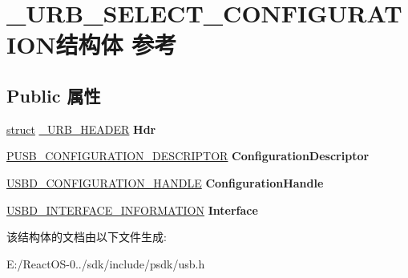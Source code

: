 \hypertarget{struct___u_r_b___s_e_l_e_c_t___c_o_n_f_i_g_u_r_a_t_i_o_n}{}\section{\+\_\+\+U\+R\+B\+\_\+\+S\+E\+L\+E\+C\+T\+\_\+\+C\+O\+N\+F\+I\+G\+U\+R\+A\+T\+I\+O\+N结构体 参考}
\label{struct___u_r_b___s_e_l_e_c_t___c_o_n_f_i_g_u_r_a_t_i_o_n}
\subsection*{Public 属性}
\begin{DoxyCompactItemize}
\item 
\mbox{\label{struct___u_r_b___s_e_l_e_c_t___c_o_n_f_i_g_u_r_a_t_i_o_n_a3808251bb604591b86b0ecfcd45194d4}} 
\hyperlink{interfacestruct}{struct} \hyperlink{struct___u_r_b___h_e_a_d_e_r}{\+\_\+\+U\+R\+B\+\_\+\+H\+E\+A\+D\+ER} {\bfseries Hdr}
\item 
\mbox{\label{struct___u_r_b___s_e_l_e_c_t___c_o_n_f_i_g_u_r_a_t_i_o_n_a7b67e21b40c39b445bc02e859d31dfcc}} 
\hyperlink{struct___u_s_b___c_o_n_f_i_g_u_r_a_t_i_o_n___d_e_s_c_r_i_p_t_o_r}{P\+U\+S\+B\+\_\+\+C\+O\+N\+F\+I\+G\+U\+R\+A\+T\+I\+O\+N\+\_\+\+D\+E\+S\+C\+R\+I\+P\+T\+OR} {\bfseries Configuration\+Descriptor}
\item 
\mbox{\label{struct___u_r_b___s_e_l_e_c_t___c_o_n_f_i_g_u_r_a_t_i_o_n_af50e684574e013c1c68bef8dd13a644d}} 
\hyperlink{interfacevoid}{U\+S\+B\+D\+\_\+\+C\+O\+N\+F\+I\+G\+U\+R\+A\+T\+I\+O\+N\+\_\+\+H\+A\+N\+D\+LE} {\bfseries Configuration\+Handle}
\item 
\mbox{\label{struct___u_r_b___s_e_l_e_c_t___c_o_n_f_i_g_u_r_a_t_i_o_n_a7d141394bc2ef5657125e13a862ae586}} 
\hyperlink{struct___u_s_b_d___i_n_t_e_r_f_a_c_e___i_n_f_o_r_m_a_t_i_o_n}{U\+S\+B\+D\+\_\+\+I\+N\+T\+E\+R\+F\+A\+C\+E\+\_\+\+I\+N\+F\+O\+R\+M\+A\+T\+I\+ON} {\bfseries Interface}
\end{DoxyCompactItemize}


该结构体的文档由以下文件生成\+:\begin{DoxyCompactItemize}
\item 
E\+:/\+React\+O\+S-\/0../sdk/include/psdk/usb.\+h\end{DoxyCompactItemize}
